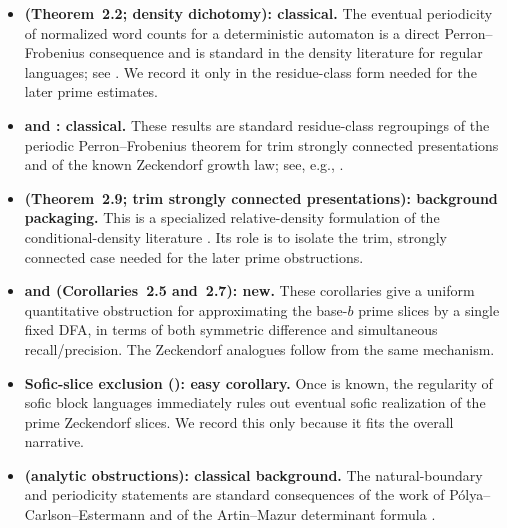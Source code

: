 \begin{itemize}
  \item \textbf{ (Theorem~2.2; density dichotomy):
  classical.} The eventual periodicity of normalized word counts for a
  deterministic automaton is a direct Perron--Frobenius consequence and
  is standard in the density literature for regular languages; see
  \cite{Berstel1973,SalomaaSoittola1978,BodirskyGaertnerVonOertzenSchwinghammer2004,Bell2020UpperDensity,Koga2019Density,BerstelReutenauer2011}.
  We record it only in the residue-class form needed for the later
  prime estimates.

  \item \textbf{ and
  : classical.} These results are standard residue-class regroupings of
  the periodic Perron--Frobenius theorem for trim strongly connected
  presentations and of the known Zeckendorf growth law; see, e.g.,
  \cite{SalomaaSoittola1978,LecomteRigo2001,CharlierRampersad2011}.

  \item \textbf{ (Theorem~2.9; trim strongly connected
  presentations): background packaging.} This is a specialized
  relative-density formulation of the conditional-density literature
  \cite{HanselPerrin1989,Kozik2005Conditional,Koga2019Density,Montoya2025Relative,BertheGouletPerrin2025}.
  Its role is to isolate the trim, strongly connected case needed for
  the later prime obstructions.

  \item \textbf{ and
   (Corollaries~2.5 and~2.7): new.}
  These corollaries give a uniform quantitative obstruction for
  approximating the base-\(b\) prime slices by a single fixed DFA, in
  terms of both symmetric difference and simultaneous recall/precision.
  The Zeckendorf analogues
   follow from
  the same mechanism.

  \item \textbf{Sofic-slice exclusion
  (): easy corollary.} Once
   is known, the
  regularity of sofic block languages immediately rules out eventual
  sofic realization of the prime Zeckendorf slices. We record this only
  because it fits the overall narrative.

  \item \textbf{ (analytic obstructions):
  classical background.} The natural-boundary and periodicity
  statements are standard consequences of the work of
  P\'olya--Carlson--Estermann and of the Artin--Mazur determinant
  formula \cite{Polya1923,Carlson1921,Estermann1928,ArtinMazur1965,BowenLanford1970}.
\end{itemize}
